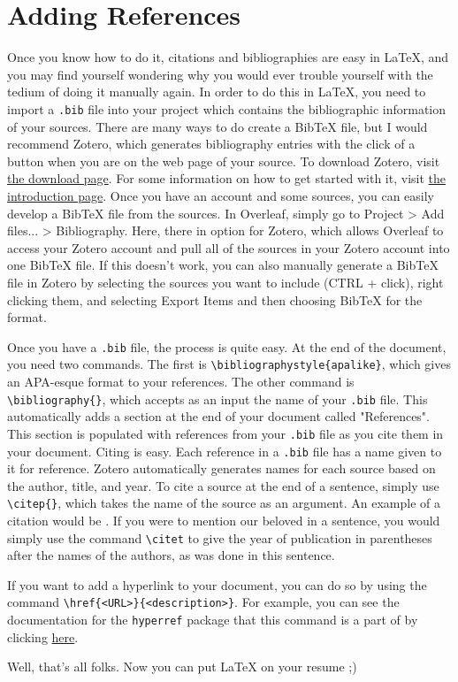 \documentclass[english,12pt]{article}
\begin{document}
\section*{Adding References}
Once you know how to do it, citations and bibliographies are easy in \LaTeX, and you may find yourself wondering why you would ever trouble yourself with the tedium of doing it manually again. In order to do this in \LaTeX, you need to import a \texttt{.bib} file into your project which contains the bibliographic information of your sources. There are many ways to do create a BibTeX file, but I would recommend Zotero, which generates bibliography entries with the click of a button when you are on the web page of your source. To download Zotero, visit \href{https://www.zotero.org/download/}{the download page}. For some information on how to get started with it, visit \href{https://www.zotero.org/support/start}{the introduction page}. Once you have an account and some sources, you can easily develop a BibTeX file from the sources. In Overleaf, simply go to Project > Add files... > Bibliography. Here, there in option for Zotero, which allows Overleaf to access your Zotero account and pull all of the sources in your Zotero account into one BibTeX file. If this doesn't work, you can also manually generate a BibTeX file in Zotero by selecting the sources you want to include (CTRL + click), right clicking them, and selecting Export Items and then choosing BibTeX for the format.

Once you have a \texttt{.bib} file, the process is quite easy. At the end of the document, you need two commands. The first is \texttt{\textbackslash bibliographystyle\{apalike\}}, which gives an APA-esque format to your references. The other command is \texttt{\textbackslash bibliography\{\}}, which accepts as an input the name of your \texttt{.bib} file. This automatically adds a section at the end of your document called "References". This section is populated with references from your \texttt{.bib} file as you cite them in your document. Citing is easy. Each reference in a \texttt{.bib} file has a name given to it for reference. Zotero automatically generates names for each source based on the author, title, and year. To cite a source at the end of a sentence, simply use \texttt{\textbackslash citep\{\}}, which takes the name of the source as an argument. An example of a citation would be \citep{tennekes_first_1972}. If you were to mention our beloved \citet{tennekes_first_1972} in a sentence, you would simply use the command \texttt{\textbackslash citet} to give the year of publication in parentheses after the names of the authors, as was done in this sentence.

If you want to add a hyperlink to your document, you can do so by using the command \texttt{\textbackslash href\{<URL>\}\{<description>\}}. For example, you can see the documentation for the \texttt{hyperref} package that this command is a part of by clicking \href{https://en.wikibooks.org/wiki/LaTeX/Hyperlinks}{here}. 
\vspace{1cm}

\noindent Well, that's all folks. Now you can put LaTeX on your resume ;)



\end{document}
